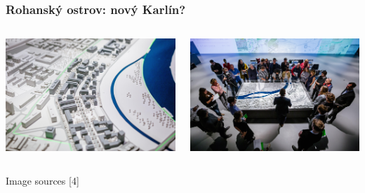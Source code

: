 \documentclass[czech,xcolor={table}]{beamer}
\begin{document}
	\begin{frame}
		\frametitle{Rohanský ostrov: nový Karlín?}
		\begin{columns}
			\begin{column}{0.5\textwidth}
				\begin{center}
					\includegraphics[width=1\textwidth]{imgs/rohan1.jpg}
				\end{center}
			\end{column}
			\begin{column}{0.5\textwidth}
				\begin{center}
					\includegraphics[width=1\textwidth]{imgs/rohan3.jpg}
				\end{center}
			\end{column}
		\end{columns}	
		\vspace{1em}
		\tiny Image sources [4]
	\end{frame}
\end{document}
